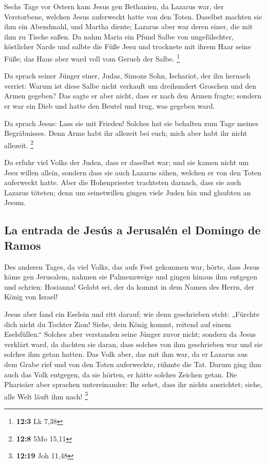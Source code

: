  Sechs Tage vor Ostern kam Jesus gen Bethanien, da Lazarus
war, der Verstorbene, welchen Jesus auferweckt hatte von den Toten.
 Daselbst machten sie ihm ein Abendmahl, und Martha
diente; Lazarus aber war deren einer, die mit ihm zu Tische saßen.
 Da nahm Maria ein Pfund Salbe von ungefälschter,
köstlicher Narde und salbte die Füße Jesu und trocknete mit ihrem Haar
seine Füße; das Haus aber ward voll vom Geruch der Salbe. \footnote{\textbf{12:3}
  Lk 7,38}

 Da sprach seiner Jünger einer, Judas, Simons Sohn,
Ischariot, der ihn hernach verriet:  Warum ist diese Salbe
nicht verkauft um dreihundert Groschen und den Armen gegeben?
 Das sagte er aber nicht, dass er nach den Armen fragte;
sondern er war ein Dieb und hatte den Beutel und trug, was gegeben ward.

 Da sprach Jesus: Lass sie mit Frieden! Solches hat sie
behalten zum Tage meines Begräbnisses.  Denn Arme habt ihr
allezeit bei euch; mich aber habt ihr nicht allezeit. \footnote{\textbf{12:8}
  5Mo 15,11}

 Da erfuhr viel Volks der Juden, dass er daselbst war; und
sie kamen nicht um Jesu willen allein, sondern dass sie auch Lazarus
sähen, welchen er von den Toten auferweckt hatte.  Aber
die Hohenpriester trachteten darnach, dass sie auch Lazarus töteten;
 denn um seinetwillen gingen viele Juden hin und glaubten
an Jesum.

\hypertarget{la-entrada-de-jesuxfas-a-jerusaluxe9n-el-domingo-de-ramos}{%
\subsection{La entrada de Jesús a Jerusalén el Domingo de
Ramos}\label{la-entrada-de-jesuxfas-a-jerusaluxe9n-el-domingo-de-ramos}}

 Des anderen Tages, da viel Volks, das aufs Fest gekommen
war, hörte, dass Jesus käme gen Jerusalem,  nahmen sie
Palmenzweige und gingen hinaus ihm entgegen und schrien: Hosianna!
Gelobt sei, der da kommt in dem Namen des Herrn, der König von Israel!

 Jesus aber fand ein Eselein und ritt darauf; wie denn
geschrieben steht:  „Fürchte dich nicht du Tochter Zion!
Siehe, dein König kommt, reitend auf einem Eselsfüllen.``
 Solches aber verstanden seine Jünger zuvor nicht;
sondern da Jesus verklärt ward, da dachten sie daran, dass solches von
ihm geschrieben war und sie solches ihm getan hatten. 
Das Volk aber, das mit ihm war, da er Lazarus aus dem Grabe rief und von
den Toten auferweckte, rühmte die Tat.  Darum ging ihm
auch das Volk entgegen, da sie hörten, er hätte solches Zeichen getan.
 Die Pharisäer aber sprachen untereinander: Ihr sehet,
dass ihr nichts ausrichtet; siehe, alle Welt läuft ihm nach! \footnote{\textbf{12:19}
  Joh 11,48}

